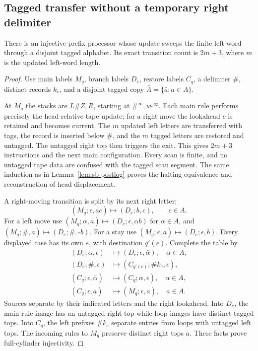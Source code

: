 \subsection{Tagged transfer without a temporary right delimiter}
\label{subsec:sb-tagged}
\begin{lemma}\label{lem:sb-tagged}
There is an injective prefix processor whose update sweeps the finite left word through a disjoint tagged alphabet.  Its exact transition count is $2m+3$, where $m$ is the updated left-word length.
\end{lemma}
\begin{proof}
Use main labels $M_q$, branch labels $D_e$, restore labels $C_q$, a delimiter $\#$, distinct records $k_e$, and a disjoint tagged copy $\bar A=\{\bar a:a\in A\}$.

At $M_q$ the stacks are $L\# Z,R$, starting at $\#^\infty,w\square^\infty$.  Each main rule performs precisely the head-relative tape update; for a right move the lookahead $c$ is retained and becomes current.  The $m$ updated left letters are transferred with tags, the record is inserted below $\#$, and the $m$ tagged letters are restored and untagged.  The untagged right top then triggers the exit.  This gives $2m+3$ instructions and the next main configuration.  Every scan is finite, and no untagged tape data are confused with the tagged scan segment.  The same induction as in Lemma~\ref{lem:sb-postlog} proves the halting equivalence and reconstruction of head displacement.

A right-moving transition is split by its next right letter:
\[
 (M_q;\epsilon,ac)\mapsto(D_e;b,c),\qquad c\in A.
\]
For a left move use $(M_q;\alpha,a)\mapsto(D_e;\epsilon,\alpha b)$ for $\alpha\in A$, and $(M_q;\#,a)\mapsto(D_e;\#,\square b)$.  For a stay use $(M_q;\epsilon,a)\mapsto(D_e;\epsilon,b)$.  Every displayed case has its own $e$, with destination $q'(e)$.  Complete the table by
\begin{align*}
 (D_e;\alpha,\epsilon)&\mapsto(D_e;\epsilon,\bar\alpha),\quad\alpha\in A,\\
 (D_e;\#,\epsilon)&\mapsto(C_{q'(e)};\#k_e,\epsilon),\\
 (C_q;\epsilon,\bar\alpha)&\mapsto(C_q;\alpha,\epsilon),\quad\alpha\in A,\\
 (C_q;\epsilon,a)&\mapsto(M_q;\epsilon,a),\quad a\in A.
\end{align*}
Sources separate by their indicated letters and the right lookahead.  Into $D_e$, the main-rule image has an untagged right top while loop images have distinct tagged tops.  Into $C_q$, the left prefixes $\#k_e$ separate entries from loops with untagged left tops.  The incoming rules to $M_q$ preserve distinct right tops $a$.  These facts prove full-cylinder injectivity.
\end{proof}

